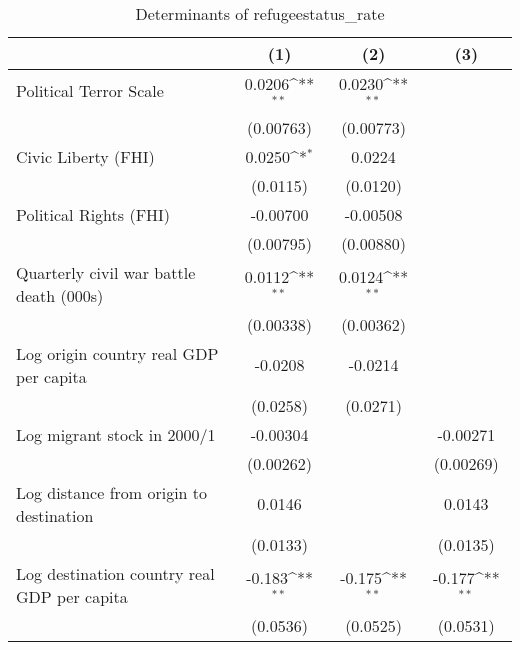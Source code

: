 \begin{table}[htbp]\centering
\def\sym#1{\ifmmode^{#1}\else\(^{#1}\)\fi}
\caption{Determinants of refugeestatus\_rate}
\begin{tabular}{l*{3}{c}}
\hline\hline
                    &\multicolumn{1}{c}{(1)}         &\multicolumn{1}{c}{(2)}         &\multicolumn{1}{c}{(3)}         \\
\hline
Political Terror Scale&      0.0206\sym{**} &      0.0230\sym{**} &                     \\
                    &   (0.00763)         &   (0.00773)         &                     \\
[1em]
Civic Liberty (FHI) &      0.0250\sym{*}  &      0.0224         &                     \\
                    &    (0.0115)         &    (0.0120)         &                     \\
[1em]
Political Rights (FHI)&    -0.00700         &    -0.00508         &                     \\
                    &   (0.00795)         &   (0.00880)         &                     \\
[1em]
Quarterly civil war battle death (000s)&      0.0112\sym{**} &      0.0124\sym{**} &                     \\
                    &   (0.00338)         &   (0.00362)         &                     \\
[1em]
Log origin country real GDP per capita&     -0.0208         &     -0.0214         &                     \\
                    &    (0.0258)         &    (0.0271)         &                     \\
[1em]
Log migrant stock in 2000/1&    -0.00304         &                     &    -0.00271         \\
                    &   (0.00262)         &                     &   (0.00269)         \\
[1em]
Log distance from origin to destination&      0.0146         &                     &      0.0143         \\
                    &    (0.0133)         &                     &    (0.0135)         \\
[1em]
Log destination country real GDP per capita&      -0.183\sym{**} &      -0.175\sym{**} &      -0.177\sym{**} \\
                    &    (0.0536)         &    (0.0525)         &    (0.0531)         \\

\end{tabular}
\end{table}
